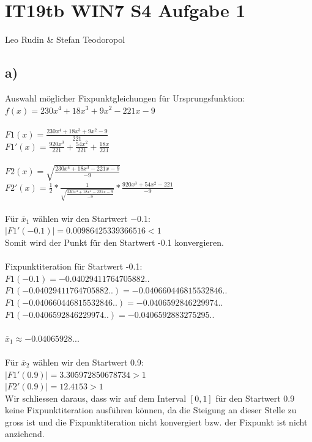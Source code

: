 \documentclass{article}
\begin{document}
\section*{IT19tb WIN7 S4 Aufgabe 1}
Leo Rudin \& Stefan Teodoropol

\subsection*{a)}

Auswahl möglicher Fixpunktgleichungen für Ursprungsfunktion: \( f(x) = 230x^4 + 18x^3 + 9x^2 - 221x - 9 \)\\\\
\( F1(x) = \frac{230x^4 + 18x^3 + 9x^2 - 9}{221} \)\\
\( F1'(x) = \frac{920x^3}{221} + \frac{54x^2}{221} + \frac{18x}{221} \)\\\\
\( F2(x) = \sqrt{\frac{230x^4 + 18x^3 - 221x - 9}{-9}} \)\\
\( F2'(x) = \frac{1}{2} * \frac{1}{\sqrt{\frac{230x^4+18x^3-221x-9}{-9}}} * \frac{920x^3+54x^2-221}{-9} \)\\\\
Für \( \overline{x}_1 \) wählen wir den Startwert \( -0.1 \):\\
\( |F1'(-0.1)| = 0.00986425339366516 < 1 \)\\
Somit wird der Punkt für den Startwert -0.1 konvergieren.\\\\
Fixpunktiteration für Startwert -0.1:\\
\( F1(-0.1) = -0.04029411764705882.. \)\\
\( F1(-0.04029411764705882..) = -0.040660446815532846.. \)\\
\( F1(-0.040660446815532846..) = -0.0406592846229974.. \)\\
\( F1(-0.0406592846229974..) = -0.0406592883275295.. \)\\\\
\( \overline{x}_1 \approx -0.04065928... \)\\\\
Für \( \overline{x}_2 \) wählen wir den Startwert 0.9:\\
\( |F1'(0.9)| = 3.305972850678734 > 1 \)\\
\( |F2'(0.9)| = 12.4153 > 1 \)\\
Wir schliessen daraus, dass wir auf dem Interval \( [0,1] \) für den Startwert 0.9 keine Fixpunktiteration ausführen können, da die Steigung an dieser Stelle zu gross ist und die Fixpunktiteration nicht konvergiert bzw. der Fixpunkt ist nicht anziehend.
\end{document}
